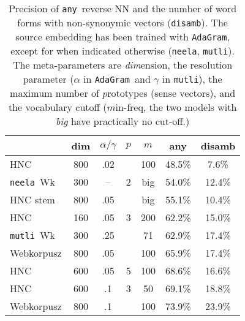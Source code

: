 \documentclass[11pt]{article}
\newcommand{\neelakantan}{\texttt{neela}}
\newcommand{\adagram}{\texttt{AdaGram}}
\newcommand{\mutli}{\texttt{mutli}}
\newcommand{\any}{\texttt{any}}
\newcommand{\disamb}{\texttt{disamb}}
\begin{document}
\begin{table}
  \centering\small
    \begin{tabular}{lcccc|cc}
      \toprule
        & dim & $\alpha/\gamma$ & $p$ & $m$ & any & disamb \\
      \midrule
      HNC	        & 800	& .02	&       & 100   & 48.5\%	&  7.6\% \\
      \neelakantan~Wk&300&--&2   &big  & 54.0\%	&  12.4\% \\
      HNC stem & 800	& .05	&       &  big & 55.1\%	&  10.4\% \\
      HNC         & 160 & .05 & 3     & 200   & 62.2\%	&  15.0\% \\
      \mutli~Wk &300&.25 &       & 71    & 62.9\%	&  17.4\% \\
      Webkorpusz	    & 800	& .05	&       & 100	  & 65.9\%	&  17.4\% \\
      HNC	        & 600	& .05	& 5     & 100	  & 68.6\%	&  16.6\% \\
      HNC	        & 600	& .1  & 3     & 50	  & 69.1\%	&  18.8\% \\
      Webkorpusz	    & 800	& .1  &       & 100	  & 73.9\%	&  23.9\% \\
      \bottomrule
    \end{tabular}
  \caption{Precision of \any~reverse NN and the number of word forms with
  non-synonymic vectors (\disamb).  The source embedding has been trained with
  \adagram, except for when indicated otherwise (\neelakantan, \mutli).  The
  meta-parameters are \emph{dim}ension, the resolution parameter ($\alpha$ in
  \adagram~and $\gamma$ in \mutli), the maximum number of $p$rototypes (sense
  vectors), and the vocabulary cutoff ($m$in-freq, the two models with
  \emph{big} have practically no cut-off.)}
    \label{tab:prec}
\end{table}
\end{document}
